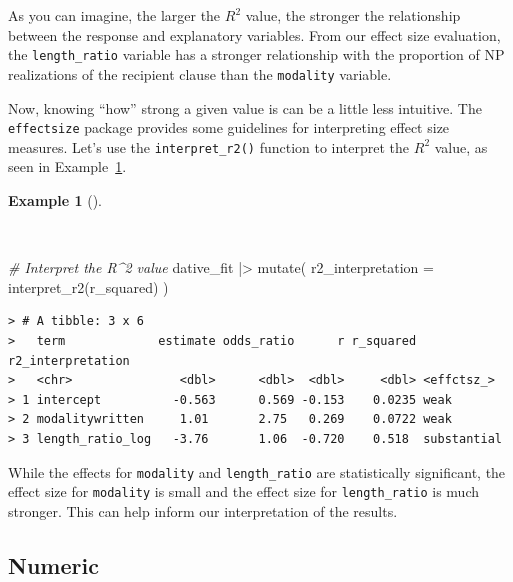 \documentclass[
  letterpaper,
  DIV=11,
  numbers=noendperiod]{scrreprt}
\newenvironment{Shaded}{\begin{snugshade}}{\end{snugshade}}
\newcommand{\AttributeTok}[1]{\textcolor[rgb]{0.00,0.00,0.00}{#1}}
\newcommand{\CommentTok}[1]{\textcolor[rgb]{0.00,0.00,0.00}{\textit{#1}}}
\newcommand{\FunctionTok}[1]{\textcolor[rgb]{0.00,0.00,0.00}{#1}}
\newcommand{\NormalTok}[1]{\textcolor[rgb]{0.00,0.00,0.00}{#1}}
\newcommand{\SpecialCharTok}[1]{\textcolor[rgb]{0.00,0.00,0.00}{#1}}
\theoremstyle{definition}
\newtheorem{example}{Example}[chapter]
\theoremstyle{remark}
\begin{document}
As you can imagine, the larger the \(R^2\) value, the stronger the
relationship between the response and explanatory variables. From our
effect size evaluation, the \texttt{length\_ratio} variable has a
stronger relationship with the proportion of NP realizations of the
recipient clause than the \texttt{modality} variable.

Now, knowing ``how'' strong a given value is can be a little less
intuitive. The \texttt{effectsize} package provides some guidelines for
interpreting effect size measures. Let's use the
\texttt{interpret\_r2()} function to interpret the \(R^2\) value, as
seen in Example~\ref{exm-ida-cat-interpret-r2}.

\begin{example}[]\protect\hypertarget{exm-ida-cat-interpret-r2}{}\label{exm-ida-cat-interpret-r2}

~

\begin{Shaded}
\begin{Highlighting}[]
\CommentTok{\# Interpret the R\^{}2 value}
\NormalTok{dative\_fit }\SpecialCharTok{|\textgreater{}}
  \FunctionTok{mutate}\NormalTok{(}
    \AttributeTok{r2\_interpretation =} \FunctionTok{interpret\_r2}\NormalTok{(r\_squared)}
\NormalTok{  )}
\end{Highlighting}
\end{Shaded}

\begin{verbatim}
> # A tibble: 3 x 6
>   term             estimate odds_ratio      r r_squared r2_interpretation
>   <chr>               <dbl>      <dbl>  <dbl>     <dbl> <effctsz_>       
> 1 intercept          -0.563      0.569 -0.153    0.0235 weak             
> 2 modalitywritten     1.01       2.75   0.269    0.0722 weak             
> 3 length_ratio_log   -3.76       1.06  -0.720    0.518  substantial
\end{verbatim}

\end{example}

While the effects for \texttt{modality} and \texttt{length\_ratio} are
statistically significant, the effect size for \texttt{modality} is
small and the effect size for \texttt{length\_ratio} is much stronger.
This can help inform our interpretation of the results.

\subsection{Numeric}\label{sec-ida-numeric}
\end{document}
